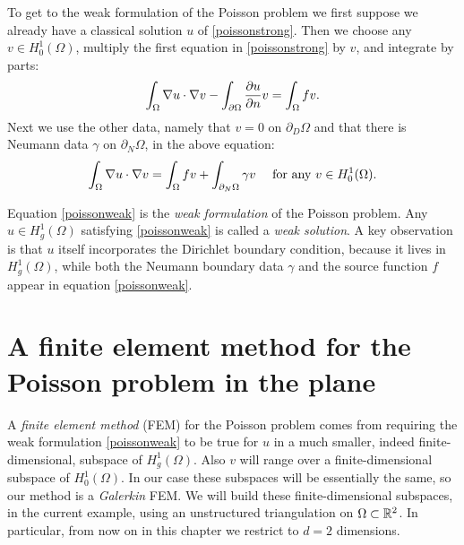 To get to the weak formulation of the Poisson problem we first suppose we already have a classical solution $u$ of \eqref{poissonstrong}.  Then we choose any $v\in H_0^1(\Omega)$, multiply the first equation in \eqref{poissonstrong} by $v$, and integrate by parts:
\begin{equation*}
\int_\Omega \nabla u \cdot \nabla v - \int_{\partial\Omega} \frac{\partial u}{\partial n} v = \int_\Omega f v.
\end{equation*}
Next 
we use the other data, namely that $v=0$ on $\partial_D\Omega$ and that there is Neumann data $\gamma$ on $\partial_N\Omega$, in the above equation:
\begin{equation}
\int_\Omega \nabla u \cdot \nabla v = \int_\Omega f v + \int_{\partial_N\Omega} \gamma v\quad \text{ for any } v\in H_0^1(\Omega). \label{poissonweak}
\end{equation}

Equation \eqref{poissonweak} is the \emph{weak formulation} of the Poisson problem.  Any $u \in H_g^1(\Omega)$ satisfying \eqref{poissonweak} is called a \emph{weak solution}.  A key observation is that $u$ itself incorporates the Dirichlet boundary condition, because it lives in $H_g^1(\Omega)$, while both the Neumann boundary data $\gamma$ and the source function $f$ appear in equation \eqref{poissonweak}.


\section{A finite element method for the Poisson problem in the plane}

A \emph{finite element method} (FEM) for the Poisson problem comes from requiring the weak formulation \eqref{poissonweak} to be true for $u$ in a much smaller, indeed finite-dimensional, subspace of $H_g^1(\Omega)$.  Also $v$ will range over a finite-dimensional subspace of $H_0^1(\Omega)$.  In our case these subspaces will be essentially the same, so our method is a \emph{Galerkin} FEM.  We will build these finite-dimensional subspaces, in the current example, using an unstructured triangulation on $\Omega\subset \mathbb{R}^2$.  In particular, from now on in this chapter we restrict to $d=2$ dimensions.

